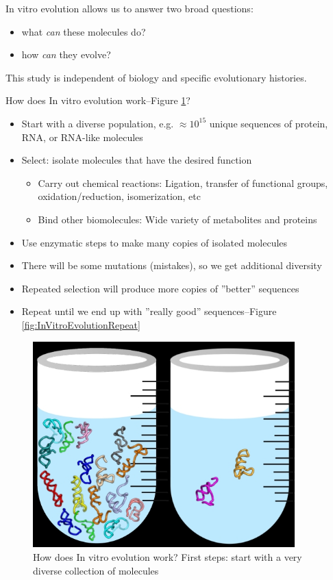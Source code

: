 \documentclass[]{article}
\begin{document}
In vitro evolution allows us to answer two broad questions:
\begin{itemize}
	\item what \textit{can} these molecules do?
	\item how \textit{can} they evolve?
\end{itemize}
This study is independent of biology and specific evolutionary histories.

How does In vitro evolution work--Figure \ref{fig:InVitroEvolution}?

\begin{itemize}
	\item Start with a diverse population, e.g. $\approx 10^{15}$ 
	unique sequences of protein, RNA, or RNA-like molecules
	\item Select: isolate molecules that have the desired function
	\begin{itemize}
		\item Carry out chemical reactions: Ligation, transfer of functional groups,
		oxidation/reduction, isomerization, etc
		\item Bind other biomolecules: 	Wide variety of metabolites and proteins
	\end{itemize}
	\item Use enzymatic steps to make many copies of isolated molecules
	\item There will be some mutations (mistakes), so we get additional diversity
	\item Repeated selection will produce more copies of ''better'' sequences
	\item Repeat until we end up with ''really good'' sequences--Figure \ref{fig:InVitroEvolutionRepeat}
\end{itemize}

\begin{figure}[H]
	\caption[How does In vitro evolution work? First steps.]{How does In vitro evolution work? First steps: start with a very diverse collection of molecules}\label{fig:InVitroEvolution}
	\includegraphics[width=0.9\textwidth]{InVitroEvolution}
\end{figure}
\end{document}
